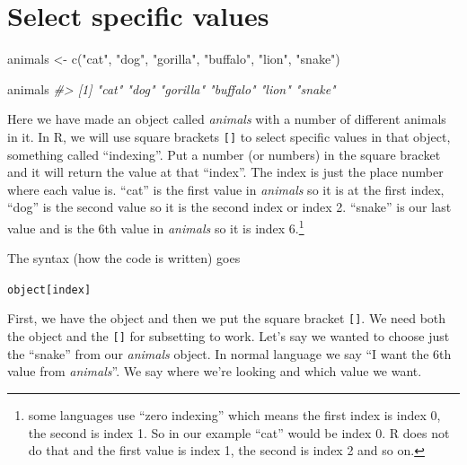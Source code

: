 \documentclass[
]{krantz}
\makeatletter
\newenvironment{Shaded}{\begin{snugshade}}{\end{snugshade}}
\newcommand{\CommentTok}[1]{\textcolor[rgb]{0.37,0.37,0.37}{\textit{#1}}}
\newcommand{\FunctionTok}[1]{\textcolor[rgb]{0,0,0}{#1}}
\newcommand{\NormalTok}[1]{#1}
\newcommand{\OtherTok}[1]{\textcolor[rgb]{0.37,0.37,0.37}{#1}}
\newcommand{\StringTok}[1]{\textcolor[rgb]{0.5,0.5,0.5}{#1}}
\newenvironment{kframe}{%
\medskip{}
\setlength{\fboxsep}{.8em}
 \def\at@end@of@kframe{}%
 \ifinner\ifhmode%
  \def\at@end@of@kframe{\end{minipage}}%
  \begin{minipage}{\columnwidth}%
 \fi\fi%
 \def\FrameCommand##1{\hskip\@totalleftmargin \hskip-\fboxsep
 \colorbox{shadecolor}{##1}\hskip-\fboxsep
     \hskip-\linewidth \hskip-\@totalleftmargin \hskip\columnwidth}%
 \MakeFramed {\advance\hsize-\width
   \@totalleftmargin\z@ \linewidth\hsize
   \@setminipage}}%
 {\par\unskip\endMakeFramed%
 \at@end@of@kframe}
\renewenvironment{Shaded}{\begin{kframe}}{\end{kframe}}
\makeatother
\begin{document}
\hypertarget{select-specific-values}{%
\section{Select specific values}\label{select-specific-values}}

\begin{Shaded}
\begin{Highlighting}[]
\NormalTok{animals }\OtherTok{\textless{}{-}} \FunctionTok{c}\NormalTok{(}\StringTok{"cat"}\NormalTok{, }\StringTok{"dog"}\NormalTok{, }\StringTok{"gorilla"}\NormalTok{, }\StringTok{"buffalo"}\NormalTok{, }\StringTok{"lion"}\NormalTok{, }\StringTok{"snake"}\NormalTok{)}
\end{Highlighting}
\end{Shaded}

\begin{Shaded}
\begin{Highlighting}[]
\NormalTok{animals}
\CommentTok{\#\textgreater{} [1] "cat"     "dog"     "gorilla" "buffalo" "lion"    "snake"}
\end{Highlighting}
\end{Shaded}

Here we have made an object called \emph{animals} with a number of different animals in it. In R, we will use square brackets \texttt{{[}{]}} to select specific values in that object, something called ``indexing''. Put a number (or numbers) in the square bracket and it will return the value at that ``index''. The index is just the place number where each value is. ``cat'' is the first value in \emph{animals} so it is at the first index, ``dog'' is the second value so it is the second index or index 2. ``snake'' is our last value and is the 6th value in \emph{animals} so it is index 6.\footnote{some languages use ``zero indexing'' which means the first index is index 0, the second is index 1. So in our example ``cat'' would be index 0. R does not do that and the first value is index 1, the second is index 2 and so on.}

The syntax (how the code is written) goes

\texttt{object{[}index{]}}

First, we have the object and then we put the square bracket \texttt{{[}{]}}. We need both the object and the \texttt{{[}{]}} for subsetting to work. Let's say we wanted to choose just the ``snake'' from our \emph{animals} object. In normal language we say ``I want the 6th value from \emph{animals}''. We say where we're looking and which value we want.
\end{document}
